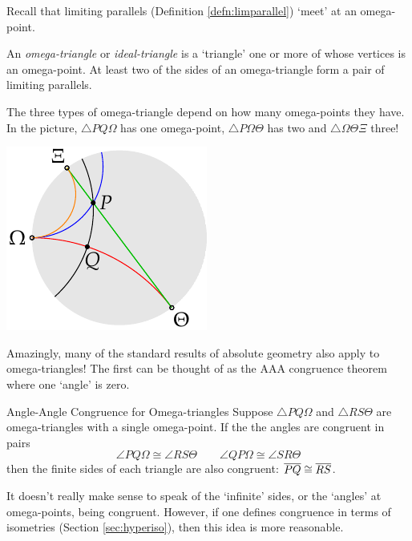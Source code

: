 \begin{minipage}[t]{0.7\linewidth}\vspace{-5pt}
Recall that limiting parallels (Definition \ref{defn:limparallel}) `meet' at an omega-point.

\begin{defn}{}{}
An \emph{omega-triangle} or \emph{ideal-triangle} is a `triangle' one or more of whose vertices is an omega-point. At least two of the sides of an omega-triangle form a pair of limiting parallels.
\end{defn}

The three types of omega-triangle depend on how many omega-points they have. In the picture, $\triangle PQ\Omega$ has one omega-point, $\triangle P\Omega\Theta$ has two and $\triangle \Omega\Theta\Xi$ three!
\end{minipage}\hfill\begin{minipage}[t]{0.28\linewidth}\vspace{-5pt}
\flushright\includegraphics{omega-example}
\end{minipage}\smallbreak
Amazingly, many of the standard results of absolute geometry also apply to omega-triangles! The first can be thought of as the AAA congruence theorem where one `angle' is zero.

\begin{thm}{Angle-Angle Congruence for Omega-triangles}{}
Suppose $\triangle PQ\Omega$ and $\triangle RS\Theta$ are omega-triangles with a single omega-point. If the the angles are congruent in pairs
\[\angle PQ\Omega \cong\angle RS\Theta \qquad \angle QP\Omega \cong\angle SR\Theta\]
then the finite sides of each triangle are also congruent: $\overline{PQ}\cong\overline{RS}$.
\end{thm}

It doesn't really make sense to speak of the `infinite' sides, or the `angles' at omega-points, being congruent. However, if one defines congruence in terms of isometries (Section \ref{sec:hyperiso}), then this idea is more reasonable. %

